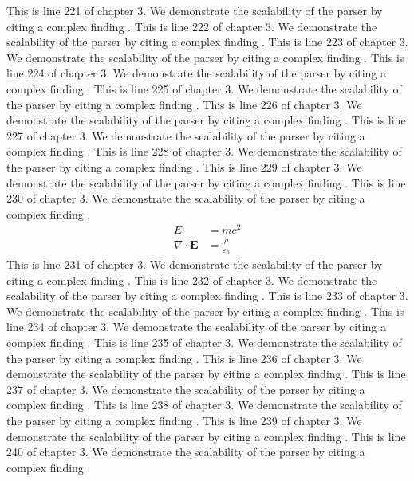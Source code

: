 This is line 221 of chapter 3. We demonstrate the scalability of the parser by citing a complex finding \cite{ref3_221}.
This is line 222 of chapter 3. We demonstrate the scalability of the parser by citing a complex finding \cite{ref3_222}.
This is line 223 of chapter 3. We demonstrate the scalability of the parser by citing a complex finding \cite{ref3_223}.
This is line 224 of chapter 3. We demonstrate the scalability of the parser by citing a complex finding \cite{ref3_224}.
This is line 225 of chapter 3. We demonstrate the scalability of the parser by citing a complex finding \cite{ref3_225}.
This is line 226 of chapter 3. We demonstrate the scalability of the parser by citing a complex finding \cite{ref3_226}.
This is line 227 of chapter 3. We demonstrate the scalability of the parser by citing a complex finding \cite{ref3_227}.
This is line 228 of chapter 3. We demonstrate the scalability of the parser by citing a complex finding \cite{ref3_228}.
This is line 229 of chapter 3. We demonstrate the scalability of the parser by citing a complex finding \cite{ref3_229}.
This is line 230 of chapter 3. We demonstrate the scalability of the parser by citing a complex finding \cite{ref3_230}.
\begin{align*}
  E &= mc^2 \\
  \nabla \cdot \mathbf{E} &= \frac{\rho}{\varepsilon_0}
\end{align*}
This is line 231 of chapter 3. We demonstrate the scalability of the parser by citing a complex finding \cite{ref3_231}.
This is line 232 of chapter 3. We demonstrate the scalability of the parser by citing a complex finding \cite{ref3_232}.
This is line 233 of chapter 3. We demonstrate the scalability of the parser by citing a complex finding \cite{ref3_233}.
This is line 234 of chapter 3. We demonstrate the scalability of the parser by citing a complex finding \cite{ref3_234}.
This is line 235 of chapter 3. We demonstrate the scalability of the parser by citing a complex finding \cite{ref3_235}.
This is line 236 of chapter 3. We demonstrate the scalability of the parser by citing a complex finding \cite{ref3_236}.
This is line 237 of chapter 3. We demonstrate the scalability of the parser by citing a complex finding \cite{ref3_237}.
This is line 238 of chapter 3. We demonstrate the scalability of the parser by citing a complex finding \cite{ref3_238}.
This is line 239 of chapter 3. We demonstrate the scalability of the parser by citing a complex finding \cite{ref3_239}.
This is line 240 of chapter 3. We demonstrate the scalability of the parser by citing a complex finding \cite{ref3_240}.
